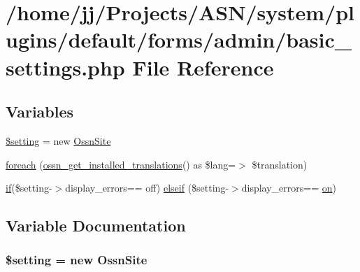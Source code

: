 \hypertarget{forms_2admin_2basic__settings_8php}{}\section{/home/jj/\+Projects/\+A\+S\+N/system/plugins/default/forms/admin/basic\+\_\+settings.php File Reference}
\label{forms_2admin_2basic__settings_8php}
\subsection*{Variables}
\begin{DoxyCompactItemize}
\item 
\hyperlink{forms_2admin_2basic__settings_8php_aad90c3283253b8d0eacda8b3ce3993b0}{\$setting} = new \hyperlink{class_ossn_site}{Ossn\+Site}
\item 
\hyperlink{forms_2admin_2basic__settings_8php_a490dbe42351a459cadfd198629bf5a92}{foreach} (\hyperlink{ossn_8lib_8languages_8php_abe7c17fb8d8dc01c326fb0f86bf1deea}{ossn\+\_\+get\+\_\+installed\+\_\+translations}() as \$lang=$>$ \$translation)
\item 
\hyperlink{jquery_8tokeninput_8js_ad8dd46a3cbc004569e34401e9e71771a}{if}(\$setting-\/$>$display\+\_\+errors== \textquotesingle{}off\textquotesingle{}) \hyperlink{forms_2admin_2basic__settings_8php_a3bc58acf2cd4d036700e61b154e8c491}{elseif} (\$setting-\/$>$display\+\_\+errors== \textquotesingle{}\hyperlink{fullpage_2plugin_8min_8js_a0258429d15d28b8440a6c44b3a15f390}{on}\textquotesingle{})
\end{DoxyCompactItemize}


\subsection{Variable Documentation}
\subsubsection[{\texorpdfstring{\$setting}{$setting}}]{\setlength{\rightskip}{0pt plus 5cm}\$setting = new {\bf Ossn\+Site}}\hypertarget{forms_2admin_2basic__settings_8php_aad90c3283253b8d0eacda8b3ce3993b0}{}\label{forms_2admin_2basic__settings_8php_aad90c3283253b8d0eacda8b3ce3993b0}


